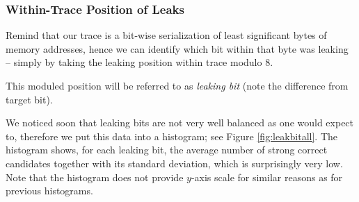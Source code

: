 	
	
	

\subsubsection{Within-Trace Position of Leaks}
	
	Remind that our trace is a bit-wise serialization of least significant bytes of memory addresses, hence we can identify which bit within that byte was leaking -- simply by taking the leaking position within trace modulo $8$.
	
	\begin{note}
	\label{note:leakbit}
		This moduled position will be referred to as {\em leaking bit} (note the difference from target bit).
	\end{note}
	
	We noticed soon that leaking bits are not very well balanced as one would expect to, therefore we put this data into a histogram; see Figure \ref{fig:leakbitall}. The histogram shows, for each leaking bit, the average number of strong correct candidates together with its standard deviation, which is surprisingly very low. Note that the histogram does not provide $y$-axis scale for similar reasons as for previous histograms.
	
